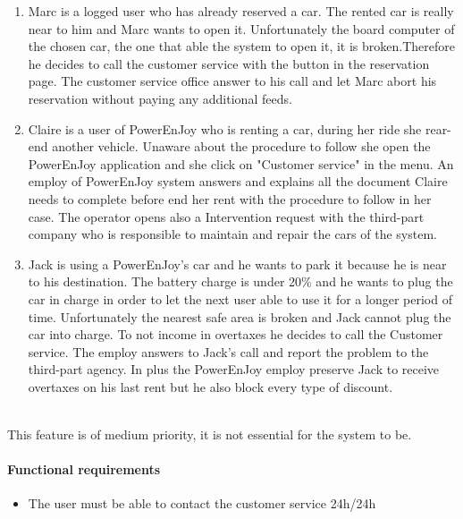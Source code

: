 \begin{enumerate}
	\item Marc is a logged user who has already reserved a car. The rented car is really near to him and Marc wants to open it. Unfortunately the board computer of the chosen car, the one that able the system to open it, it is broken.Therefore he decides to call the customer service with the button in the reservation page. The customer service office answer to his call and let Marc abort his reservation without paying any additional feeds.
	\item Claire is a user of PowerEnJoy who is renting a car, during her ride she rear-end another vehicle. Unaware about the procedure to follow she open the PowerEnJoy application and she click on "Customer service" in the menu. An employ of PowerEnJoy system answers and explains all the document Claire needs to complete before end her rent with the procedure to follow in her case. The operator opens also a Intervention request with the third-part company who is responsible to maintain and repair the cars of the system.
	\item Jack is using a PowerEnJoy's car and he wants to park it because he is near to his destination. The battery charge is under 20\% and he wants to plug the car in charge in order to let the next user able to use it for a longer period of time. Unfortunately the nearest safe area is broken and Jack cannot plug the car into charge. To not income in overtaxes he decides to call the Customer service. The employ answers to Jack's call and report the problem to the third-part agency. In plus the PowerEnJoy employ preserve Jack to receive overtaxes on his last rent but he also block every type of discount.
\end{enumerate}
 \ \\
This feature is of medium priority, it is not essential for the system to be.
\paragraph {Functional requirements }
\begin{itemize}
	\item The user must be able to contact the customer service 24h/24h
\end{itemize}
 \ \\
\newpage

